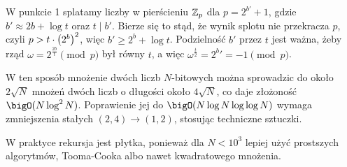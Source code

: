 W punkcie 1 splatamy liczby w pierścieniu \( \mathbb{Z}_p \) dla \( p = 2^{b'} + 1 \), gdzie \( b' \approx 2b + \log t \) oraz \( t \mid b' \). Bierze się to stąd, że wynik splotu nie przekracza \( p \), czyli \( p > t \cdot \left(2^b\right)^2 \), więc \( b′ \geq 2^b + \log t \).
Podzielność \( b' \) przez \( t \) jest ważna, żeby rząd \( \omega = 2^{\frac{2b}{t}} \pmod{p} \) był równy \( t \), a więc \( \omega^{\frac{t}{2}} = 2^b' = -1 \pmod{p} \).


W ten sposób mnożenie dwóch liczb \( N \)-bitowych można sprowadzic do około \( 2\sqrt{N} \) mnożeń dwóch liczb o długości około \( 4\sqrt{N} \), co daje złożoność \( \bigO(N \log^2 N) \). Poprawienie jej do \( \bigO(N \log N \log \log N) \) wymaga zmniejszenia stałych \( (2, 4) \rightarrow (1, 2) \), stosując techniczne sztuczki.
        
W praktyce rekursja jest płytka, ponieważ dla \( N < 10^3 \) lepiej użyć prostszych algorytmów, Tooma-Cooka albo nawet kwadratowego mnożenia.